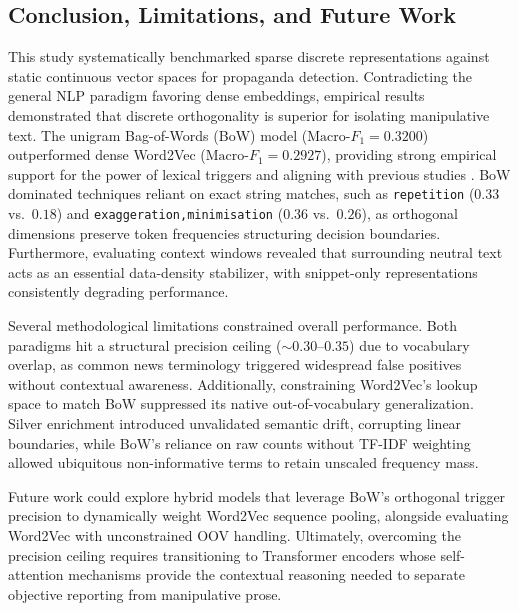 \documentclass[12pt, a4paper]{article}
\begin{document}

\subsection{Conclusion, Limitations, and Future Work}
\label{subsec:task1_conclusion}

This study systematically benchmarked sparse discrete representations against static continuous vector spaces for propaganda detection. Contradicting the general NLP paradigm favoring dense embeddings, empirical results demonstrated that discrete orthogonality is superior for isolating manipulative text. The unigram Bag-of-Words (BoW) model ($\text{Macro-}F_1 = 0.3200$) outperformed dense Word2Vec ($\text{Macro-}F_1 = 0.2927$), providing strong empirical support for the power of lexical triggers and aligning with previous studies \cite{rashkin2017}. BoW dominated techniques reliant on exact string matches, such as \texttt{repetition} ($0.33$ vs.\ $0.18$) and \texttt{exaggeration,minimisation} ($0.36$ vs.\ $0.26$), as orthogonal dimensions preserve token frequencies structuring decision boundaries. Furthermore, evaluating context windows revealed that surrounding neutral text acts as an essential data-density stabilizer, with snippet-only representations consistently degrading performance.

Several methodological limitations constrained overall performance. Both paradigms hit a structural precision ceiling ($\sim 0.30\text{--}0.35$) due to vocabulary overlap, as common news terminology triggered widespread false positives without contextual awareness. Additionally, constraining Word2Vec's lookup space to match BoW suppressed its native out-of-vocabulary generalization. Silver enrichment introduced unvalidated semantic drift, corrupting linear boundaries, while BoW's reliance on raw counts without TF-IDF weighting allowed ubiquitous non-informative terms to retain unscaled frequency mass.

Future work could explore hybrid models that leverage BoW's orthogonal trigger precision to dynamically weight Word2Vec sequence pooling, alongside evaluating Word2Vec with unconstrained OOV handling. Ultimately, overcoming the precision ceiling requires transitioning to Transformer encoders whose self-attention mechanisms provide the contextual reasoning needed to separate objective reporting from manipulative prose.


\newpage
\end{document}
